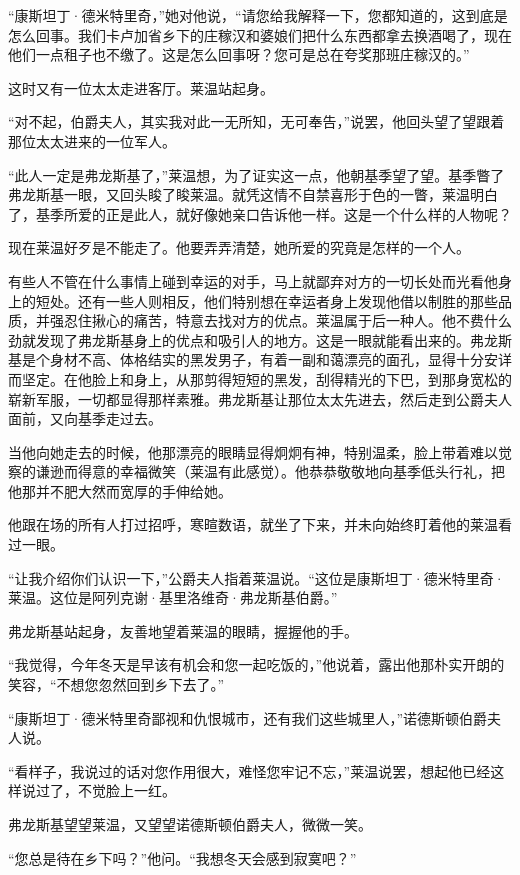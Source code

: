 \par “康斯坦丁·德米特里奇，”她对他说，“请您给我解释一下，您都知道的，这到底是怎么回事。我们卡卢加省乡下的庄稼汉和婆娘们把什么东西都拿去换酒喝了，现在他们一点租子也不缴了。这是怎么回事呀？您可是总在夸奖那班庄稼汉的。”
\par 这时又有一位太太走进客厅。莱温站起身。
\par “对不起，伯爵夫人，其实我对此一无所知，无可奉告，”说罢，他回头望了望跟着那位太太进来的一位军人。
\par “此人一定是弗龙斯基了，”莱温想，为了证实这一点，他朝基季望了望。基季瞥了弗龙斯基一眼，又回头睃了睃莱温。就凭这情不自禁喜形于色的一瞥，莱温明白了，基季所爱的正是此人，就好像她亲口告诉他一样。这是一个什么样的人物呢？
\par 现在莱温好歹是不能走了。他要弄弄清楚，她所爱的究竟是怎样的一个人。
\par 有些人不管在什么事情上碰到幸运的对手，马上就鄙弃对方的一切长处而光看他身上的短处。还有一些人则相反，他们特别想在幸运者身上发现他借以制胜的那些品质，并强忍住揪心的痛苦，特意去找对方的优点。莱温属于后一种人。他不费什么劲就发现了弗龙斯基身上的优点和吸引人的地方。这是一眼就能看出来的。弗龙斯基是个身材不高、体格结实的黑发男子，有着一副和蔼漂亮的面孔，显得十分安详而坚定。在他脸上和身上，从那剪得短短的黑发，刮得精光的下巴，到那身宽松的崭新军服，一切都显得那样素雅。弗龙斯基让那位太太先进去，然后走到公爵夫人面前，又向基季走过去。
\par 当他向她走去的时候，他那漂亮的眼睛显得炯炯有神，特别温柔，脸上带着难以觉察的谦逊而得意的幸福微笑（莱温有此感觉）。他恭恭敬敬地向基季低头行礼，把他那并不肥大然而宽厚的手伸给她。
\par 他跟在场的所有人打过招呼，寒暄数语，就坐了下来，并未向始终盯着他的莱温看过一眼。
\par “让我介绍你们认识一下，”公爵夫人指着莱温说。“这位是康斯坦丁·德米特里奇·莱温。这位是阿列克谢·基里洛维奇·弗龙斯基伯爵。”
\par 弗龙斯基站起身，友善地望着莱温的眼睛，握握他的手。
\par “我觉得，今年冬天是早该有机会和您一起吃饭的，”他说着，露出他那朴实开朗的笑容，“不想您忽然回到乡下去了。”
\par “康斯坦丁·德米特里奇鄙视和仇恨城市，还有我们这些城里人，”诺德斯顿伯爵夫人说。
\par “看样子，我说过的话对您作用很大，难怪您牢记不忘，”莱温说罢，想起他已经这样说过了，不觉脸上一红。
\par 弗龙斯基望望莱温，又望望诺德斯顿伯爵夫人，微微一笑。
\par “您总是待在乡下吗？”他问。“我想冬天会感到寂寞吧？”
